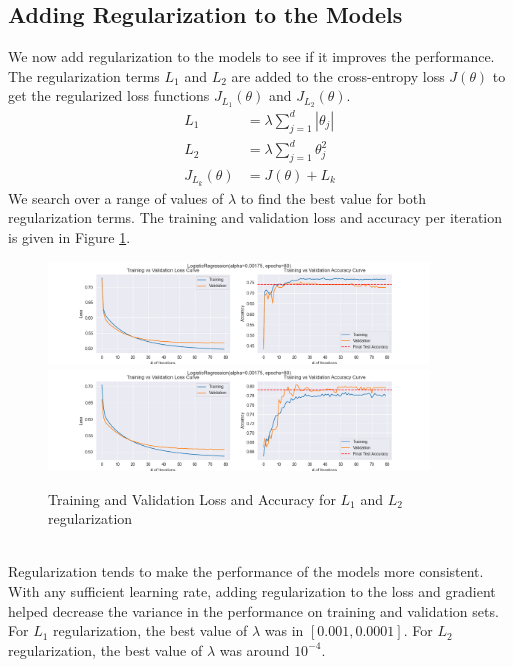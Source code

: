 \documentclass[12pt]{article}
\begin{document}
    \subsection*{Adding Regularization to the Models}
    We now add regularization to the models to see if it improves the performance. The regularization terms $L_{1}$ and $L_{2}$
    are added to the cross-entropy loss $J(\theta)$ to get the regularized loss functions
    $J_{L_{1}}(\theta)$ and $J_{L_{2}}(\theta)$.
    \begin{align}
        L_{1} &= \lambda \sum_{j=1}^{d} |\theta_{j}| \\
        L_{2} &= \lambda \sum_{j=1}^{d} \theta_{j}^{2} \\
        J_{L_{k}}(\theta) &= J(\theta) + L_{k}
    \end{align}
    We search over a range of values of $\lambda$ to find the best value for both regularization terms. The training and
    validation loss and accuracy per iteration is given in Figure \ref{fig:regularization}.
    \begin{figure}[h]
        \centering
        \includegraphics[width=0.9\textwidth]{./../Assets/reg_l1.png}
        \includegraphics[width=0.9\textwidth]{./../Assets/reg_l2.png}
        \caption{Training and Validation Loss and Accuracy for $L_{1}$ and $L_{2}$ regularization}
        \label{fig:regularization}
    \end{figure}
    \vspace*{5pt} \\
    Regularization tends to make the performance of the models more consistent. With any sufficient learning rate, adding
    regularization to the loss and gradient helped decrease the variance in the performance on training and validation sets.
    \vspace*{5pt} \\
    For $L_{1}$ regularization, the best value of $\lambda$ was in $[0.001, 0.0001]$. For $L_{2}$ regularization,
    the best value of $\lambda$ was around $10^{-4}$.
\end{document}
